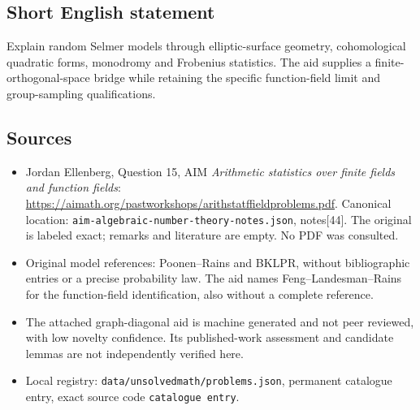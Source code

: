 \documentclass[11pt]{article}
\begin{document}
\subsection{Short English statement}
Explain random Selmer models through elliptic-surface geometry, cohomological quadratic forms, monodromy and Frobenius statistics. The aid supplies a finite-orthogonal-space bridge while retaining the specific function-field limit and group-sampling qualifications.
\subsection{Sources}
\begin{itemize}
\item Jordan Ellenberg, Question 15, AIM \emph{Arithmetic statistics over finite fields and function fields}: \url{https://aimath.org/pastworkshops/arithstatffieldproblems.pdf}. Canonical location: \texttt{aim-algebraic-number-theory-notes.json}, notes[44]. The original is labeled exact; remarks and literature are empty. No PDF was consulted.
\item Original model references: Poonen--Rains and BKLPR, without bibliographic entries or a precise probability law. The aid names Feng--Landesman--Rains for the function-field identification, also without a complete reference.
\item The attached graph-diagonal aid is machine generated and not peer reviewed, with low novelty confidence. Its published-work assessment and candidate lemmas are not independently verified here.
\item Local registry: \texttt{data/unsolvedmath/problems.json}, permanent catalogue entry, exact source code \texttt{catalogue entry}.
\end{itemize}
\end{document}
